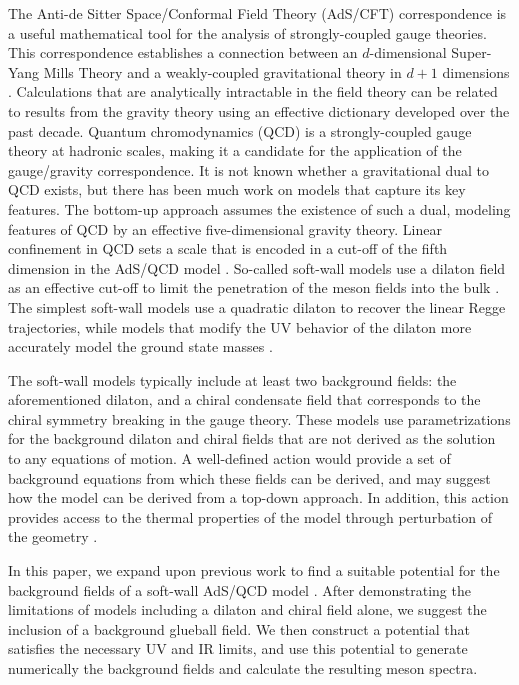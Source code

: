 \documentclass[aps,prd,12pt,nofootinbib]{revtex4}
\begin{document}
The Anti-de Sitter Space/Conformal Field Theory (AdS/CFT) correspondence is a useful mathematical tool for the analysis of strongly-coupled gauge theories.
This correspondence establishes a connection between an $d$-dimensional Super-Yang Mills Theory and a weakly-coupled gravitational theory in $d+1$ dimensions \cite{maldacena, Gubser1998, Witten:1998}. 
Calculations that are analytically intractable in the field theory can be related to results from the gravity theory using an effective dictionary developed over the past decade. 
Quantum chromodynamics (QCD) is a strongly-coupled gauge theory at hadronic scales, making it a candidate for the application of the gauge/gravity correspondence.
It is not known whether a gravitational dual to QCD exists, but there has been much work on models that capture its key features.
The bottom-up approach assumes the existence of such a dual, modeling features of QCD by an effective five-dimensional gravity theory.
Linear confinement in QCD sets a scale that is encoded in a cut-off of the fifth dimension in the AdS/QCD model \cite{stephanov-katz-son, DaRold2005}. 
So-called soft-wall models use a dilaton field as an effective cut-off to limit the penetration of the meson fields into the bulk \cite{karch-katz-son-adsqcd}. 
The simplest soft-wall models use a quadratic dilaton to recover the linear Regge trajectories, while models that modify the UV behavior of the dilaton more accurately model the ground state masses \cite{gherghetta-kelley, bartz-pions, Colangelo2008, Cui2013}.

The soft-wall models typically include at least two background fields: the aforementioned dilaton, and a chiral condensate field that corresponds to the chiral symmetry breaking in the gauge theory.
These models use parametrizations for the background dilaton and chiral fields that are not derived as the solution to any equations of motion. 
A well-defined action would provide a set of background equations from which these fields can be derived, and may suggest how the model can be derived from a top-down approach. 
In addition, this action provides access to the thermal properties of the model through perturbation of the geometry \cite{Herzog2007, Bayona2008, Gursoy2008b}.

In this paper, we expand upon previous work to find a suitable potential for the background fields of a soft-wall AdS/QCD model \cite{Batell2008, Springer2010, Gursoy2008a, Gursoy2008b, Csaki2007, Li2013, Li2013a, He2013}. 
After demonstrating the limitations of models including a dilaton and chiral field alone, we suggest the inclusion of a background glueball field. 
We then construct a potential that satisfies the necessary UV and IR limits, and use this potential to generate numerically the background fields and calculate the resulting meson spectra.
\end{document}
